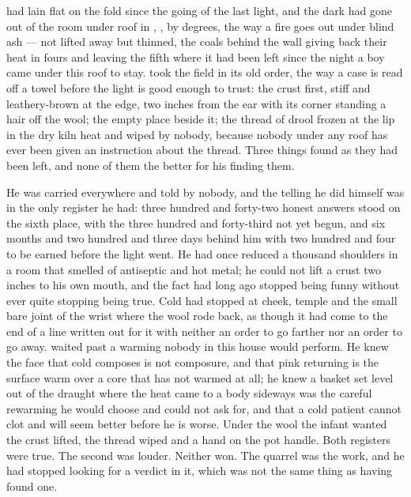 
 had lain flat on the fold since the going of the last light, and the dark had gone out of the room under  roof in , ,  by degrees, the way a fire goes out under blind ash --- not lifted away but thinned, the coals behind the wall giving back their heat in fours and leaving the fifth where it had been left since the night a boy came under this roof to stay.  took the field in its old order, the way a case is read off a towel before the light is good enough to trust: the crust first, stiff and leathery-brown at the edge, two inches from the ear with its corner standing a hair off the wool; the empty place beside it; the thread of drool frozen at the lip in the dry kiln heat and wiped by nobody, because nobody under any roof has ever been given an instruction about the thread. Three things found as they had been left, and none of them the better for his finding them.

He was carried everywhere and told by nobody, and the telling he did himself was in the only register he had: three hundred and forty-two honest answers stood on the sixth place, with the three hundred and forty-third not yet begun, and six months and two hundred and three days behind him with two hundred and four to be earned before the light went. He had once reduced a thousand shoulders in a room that smelled of antiseptic and hot metal; he could not lift a crust two inches to his own mouth, and the fact had long ago stopped being funny without ever quite stopping being true. Cold had stopped at cheek, temple and the small bare joint of the wrist where the wool rode back, as though it had come to the end of a line written out for it with neither an order to go farther nor an order to go away.  waited past a warming nobody in this house would perform. He knew the face that cold composes is not composure, and that pink returning is the surface warm over a core that has not warmed at all; he knew a basket set level out of the draught where the heat came to a body sideways was the careful rewarming he would choose and could not ask for, and that a cold patient cannot clot and will seem better before he is worse. Under the wool the infant wanted the crust lifted, the thread wiped and a hand on the pot handle. Both registers were true. The second was louder. Neither won. The quarrel was the work, and he had stopped looking for a verdict in it, which was not the same thing as having found one.

